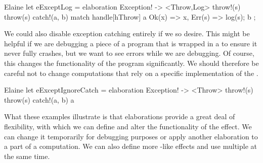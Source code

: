 \begin{lst}{Elaine}
let eExceptLog = elaboration Exception! -> <Throw,Log> {
    throw!(s) { throw(s) }
    catch!(a, b) {
        match handle[hThrow] a {
            Ok(x) => x,
            Err(s) => {
                log(s);
                b
            }
        }
    }
};
\end{lst}

We could also disable exception catching entirely if we so desire. This might be helpful if we are debugging a piece of a program that is wrapped in a  to ensure it never fully crashes, but we want to see errors while we are debugging. Of course, this changes the functionality of the program significantly. We should therefore be careful not to change computations that rely on a specific implementation of the .

\begin{lst}{Elaine}
let eExceptIgnoreCatch = elaboration Exception! -> <Throw> {
    throw!(s) { throw(s) }
    catch!(a, b) { a }
}
\end{lst}

What these examples illustrate is that elaborations provide a great deal of flexibility, with which we can define and alter the functionality of the  effect. We can change it temporarily for debugging purposes or apply another elaboration to a part of a computation. We can also define more -like effects and use multiple at the same time.
